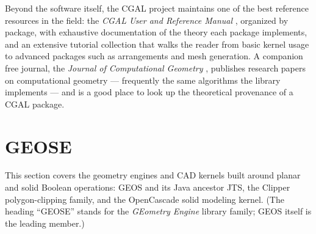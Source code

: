 Beyond the software itself, the CGAL project maintains one of the best
reference resources in the field: the \emph{CGAL User and Reference
Manual} \cite{cgalmanual}, organized by package, with exhaustive
documentation of the theory each package implements, and an extensive
tutorial collection that walks the reader from basic kernel usage to
advanced packages such as arrangements and mesh generation. A companion
free journal, the \emph{Journal of Computational Geometry} \cite{jocg},
publishes research papers on computational geometry --- frequently the
same algorithms the library implements --- and is a good place to look
up the theoretical provenance of a CGAL package.

\section{GEOSE}
\label{sec:app_soft_geose}

This section covers the geometry engines and CAD kernels built around
planar and solid Boolean operations: GEOS and its Java ancestor JTS,
the Clipper polygon-clipping family, and the OpenCascade solid modeling
kernel. (The heading ``GEOSE'' stands for the \emph{GEometry Engine}
library family; GEOS itself is the leading member.)

